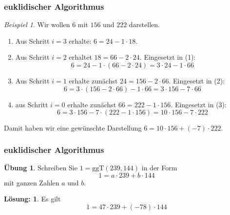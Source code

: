 \documentclass[hyperref={pdfpagelabels=false}]{beamer}
\theoremstyle{plain}%
\theoremstyle{definition}
\newtheorem*{uebung}{Übung}
\newtheorem*{sol}{Lösung:}
\theoremstyle{remark}
\newtheorem*{beispiel}{Beispiel}
\begin{document}
\begin{frame}
\frametitle{euklidischer Algorithmus}

\begin{beispiel}
Wir wollen $6$ mit $156$ und $222$ darstellen.

\begin{enumerate}
\item<2-> Aus Schritt $i=3$ erhalte: $6 = 24 - 1 \cdot 18$.
\item<3-> Aus Schritt $i=2$ erhaltet $18 = 66 - 2 \cdot 24$.
Eingesetzt in  (1): 
  	$$ 6 = 24 - 1 \cdot  \left(66 - 2 \cdot 24\right) =3 \cdot 24 - 1 \cdot 66 $$
\item<4-> Aus Schritt $ i = 1$ erhalte zunächst $24 = 156 - 2 \cdot 66$.
Eingesetzt in  (2): 
  	$$ 6 = 3 \cdot \left( 156 - 2 \cdot 66 \right) - 1 \cdot 66 = 3 \cdot 156 - 7 \cdot 66 $$
\item<5-> aus Schritt $i = 0$ erhalte zunächst $66 = 222 - 1 \cdot 156$.
Eingesetzt in  (3): 
  	$$ 6 =  3 \cdot 156 - 7 \cdot \left( 222 - 1 \cdot 156 \right) = 10 \cdot 156 - 7 \cdot 222 $$
\end{enumerate}
\vspace{-0.6cm}
\pause \pause \pause \pause \pause %
Damit haben wir eine gewünschte Darstellung $ 6 = 10 \cdot 156 + (- 7) \cdot 222$.
\end{beispiel}

\end{frame}

\begin{frame}
\frametitle{euklidischer Algorithmus}

\begin{uebung}
Schreiben Sie $1 = \mathrm{ggT}(239, 144)$ in der Form 
	$$ 1 = a \cdot 239 + b \cdot 144 $$
mit ganzen Zahlen $a$ und $b$.
\end{uebung}

\bigbreak

\pause \pause 

\begin{sol}
Es gilt 
	$$ 1 = 47 \cdot 239 + (-78) \cdot 144 $$
\end{sol} 

\end{frame}
\end{document}
